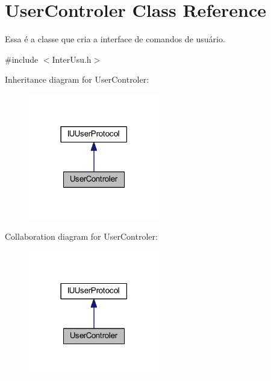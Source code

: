 \hypertarget{class_user_controler}{\section{User\-Controler Class Reference}
\label{class_user_controler}
}


Essa é a classe que cria a interface de comandos de usuário.  




{\ttfamily \#include $<$Inter\-Usu.\-h$>$}



Inheritance diagram for User\-Controler\-:\nopagebreak
\begin{figure}[H]
\begin{center}
\leavevmode
\includegraphics[width=162pt]{class_user_controler__inherit__graph}
\end{center}
\end{figure}


Collaboration diagram for User\-Controler\-:\nopagebreak
\begin{figure}[H]
\begin{center}
\leavevmode
\includegraphics[width=162pt]{class_user_controler__coll__graph}
\end{center}
\end{figure}
